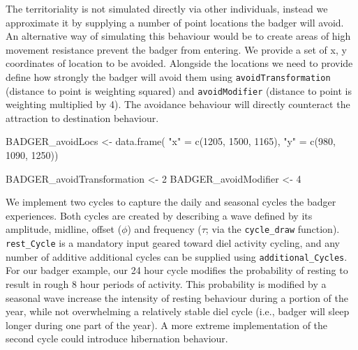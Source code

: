 \documentclass[10pt,a4paper]{article}
\newenvironment{Shaded}{}{}
\newcommand{\DecValTok}[1]{#1}
\newcommand{\FunctionTok}[1]{#1}
\newcommand{\NormalTok}[1]{#1}
\newcommand{\OtherTok}[1]{#1}
\newcommand{\StringTok}[1]{#1}
\begin{document}
The territoriality is not simulated directly via other individuals, instead we approximate it by supplying a number of point locations the badger will avoid.
An alternative way of simulating this behaviour would be to create areas of high movement resistance prevent the badger from entering.
We provide a set of x, y coordinates of location to be avoided.
Alongside the locations we need to provide define how strongly the badger will avoid them using \texttt{avoidTransformation} (distance to point is weighting squared) and \texttt{avoidModifier} (distance to point is weighting multiplied by 4).
The avoidance behaviour will directly counteract the attraction to destination behaviour.

\begin{Shaded}
\begin{Highlighting}[]
\NormalTok{BADGER\_avoidLocs }\OtherTok{\textless{}{-}} \FunctionTok{data.frame}\NormalTok{(}
  \StringTok{"x"} \OtherTok{=} \FunctionTok{c}\NormalTok{(}\DecValTok{1205}\NormalTok{, }\DecValTok{1500}\NormalTok{, }\DecValTok{1165}\NormalTok{),}
  \StringTok{"y"} \OtherTok{=} \FunctionTok{c}\NormalTok{(}\DecValTok{980}\NormalTok{, }\DecValTok{1090}\NormalTok{, }\DecValTok{1250}\NormalTok{))}

\NormalTok{BADGER\_avoidTransformation }\OtherTok{\textless{}{-}} \DecValTok{2}
\NormalTok{BADGER\_avoidModifier }\OtherTok{\textless{}{-}} \DecValTok{4}
\end{Highlighting}
\end{Shaded}

We implement two cycles to capture the daily and seasonal cycles the badger experiences.
Both cycles are created by describing a wave defined by its amplitude, midline, offset (\(\phi\)) and frequency (\(\tau\); via the \texttt{cycle\_draw} function).
\texttt{rest\_Cycle} is a mandatory input geared toward diel activity cycling, and any number of additive additional cycles can be supplied using \texttt{additional\_Cycles}.
For our badger example, our 24 hour cycle modifies the probability of resting to result in rough 8 hour periods of activity.
This probability is modified by a seasonal wave increase the intensity of resting behaviour during a portion of the year, while not overwhelming a relatively stable diel cycle (i.e., badger will sleep longer during one part of the year).
A more extreme implementation of the second cycle could introduce hibernation behaviour.
\end{document}
